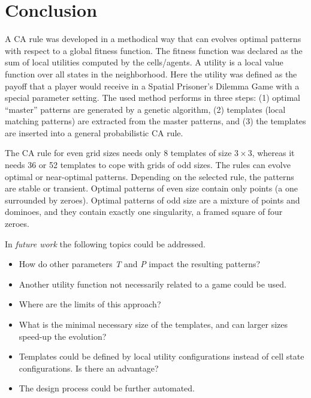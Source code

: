 \documentclass[10pt,a4paper]{article}  %
\begin{document}
    
\section{Conclusion}

A CA rule was developed in a methodical way that can evolves optimal patterns
with respect to a global fitness function.
The fitness function was declared as the sum of local utilities computed by the cells/agents.
A utility is a local value function over all states in the neighborhood.
Here the utility was defined as the payoff that a player would receive in
a Spatial Prisoner's Dilemma Game with a special parameter setting. 
The used method performs in three steps:
(1) optimal ``master'' patterns are generated by a genetic algorithm,
(2) templates (local matching patterns) are extracted from the master patterns, and
(3) the templates are inserted into a general probabilistic CA rule.

The CA rule for even grid sizes needs only 8 templates of size $3\times 3$,
whereas it needs 36 or 52 templates to cope with grids of odd sizes.
The rules can evolve optimal or near-optimal patterns.
Depending on the selected rule, the patterns are stable or transient.
Optimal patterns of even size contain only points (a one surrounded by zeroes).
Optimal patterns of odd size are a mixture of points and dominoes,
and they contain exactly one singularity, a framed square of four zeroes. 

In \textit{future work} the following topics could be addressed.
\vspace{-7pt}
\begin{itemize}
	\item 
  How do other parameters \textit{T} and \textit{P} impact the resulting patterns?
  \item
  Another utility function not necessarily related to a game could be used.
  \item
  Where are the limits of this approach?  
  \item
  What is the minimal necessary size of the templates, and can larger sizes speed-up the
  evolution?
  \item
  Templates could be defined by local utility configurations instead of cell state configurations.
  Is there an advantage?
  
  \item
  The design process could be further automated.
\end{itemize}
\end{document}
